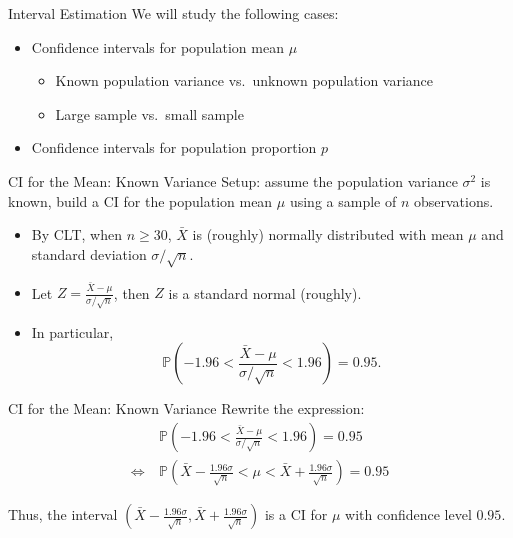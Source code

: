 \documentclass{beamer}
\newcommand{\pr}{\mathbb{P}}
\begin{document}
\begin{frame}{Interval Estimation}
    We will study the following cases:
    \begin{itemize}
    \item Confidence intervals for population mean $\mu$
    \begin{itemize}
            \item Known population variance vs.\ unknown population variance
            \item Large sample vs.\ small sample
    \end{itemize}
    \item Confidence intervals for population proportion $p$
    \end{itemize}
\end{frame}

\begin{frame}{CI for the Mean: Known Variance}
    Setup: assume the population variance $\sigma^2$ is known, build a CI for the population mean $\mu$ using a sample of $n$ observations.

    \begin{itemize}
        \item By CLT, when $n\geq30$, $\bar X$ is (roughly) normally distributed with mean $\mu$ and standard deviation $\sigma/\sqrt{n}$.
        \item Let $Z=\frac{\bar X - \mu}{\sigma/\sqrt{n}}$, then $Z$ is a standard normal (roughly).
    \item In particular,
        $$ \pr(-1.96 < \frac{\bar X - \mu}{\sigma/\sqrt{n}} < 1.96) = 0.95.$$
    \end{itemize}
\end{frame}


\begin{frame}{CI for the Mean: Known Variance}
    Rewrite the expression:
    \begin{align*}
        & \pr(-1.96 < \frac{\bar X - \mu}{\sigma/\sqrt{n}} < 1.96) = 0.95 \\
        \iff \ & \pr (\bar X - \frac{1.96 \sigma}{\sqrt{n}} < \mu < 
        \bar X + \frac{1.96 \sigma}{\sqrt{n}}) = 0.95
    \end{align*}

    Thus, the interval $(\bar X - \frac{1.96 \sigma}{\sqrt{n}},\bar X + \frac{1.96 \sigma}{\sqrt{n}})$ is 
    a CI for $\mu$ with confidence level $0.95$.
\end{frame}
\end{document}
